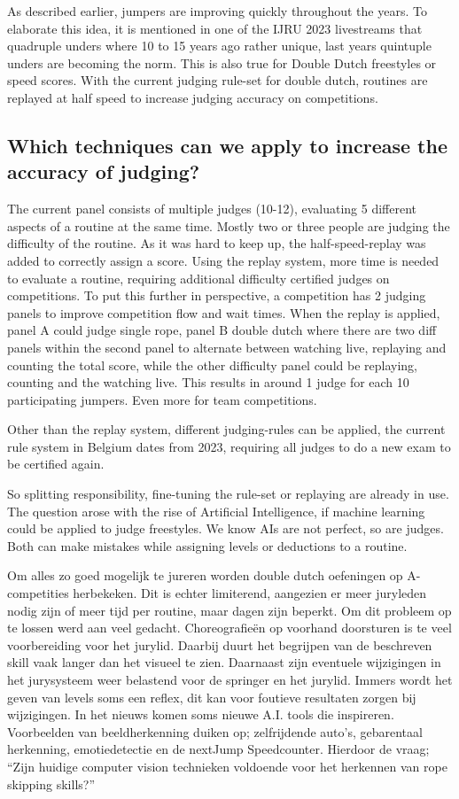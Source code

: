 As described earlier, jumpers are improving quickly throughout the years. To elaborate this idea, it is mentioned in one of the IJRU 2023 livestreams that quadruple unders where 10 to 15 years ago rather unique, last years quintuple unders are becoming the norm. This is also true for Double Dutch freestyles or speed scores. With the current judging rule-set for double dutch, routines are replayed at half speed to increase judging accuracy on competitions.

\subsection{Which techniques can we apply to increase the accuracy of judging?}

The current panel consists of multiple judges (10-12), evaluating 5 different aspects of a routine at the same time. Mostly two or three people are judging the difficulty of the routine. As it was hard to keep up, the half-speed-replay was added to correctly assign a score.
Using the replay system, more time is needed to evaluate a routine, requiring additional difficulty certified judges on competitions. To put this further in perspective, a competition has 2 judging panels to improve competition flow and wait times. When the replay is applied, panel A could judge single rope, panel B double dutch where there are two diff panels within the second panel to alternate between watching live, replaying and counting the total score, while the other difficulty panel could be replaying, counting and the watching live. This results in around 1 judge for each 10 participating jumpers. Even more for team competitions.

Other than the replay system, different judging-rules can be applied, the current rule system in Belgium dates from 2023, requiring all judges to do a new exam to be certified again.

So splitting responsibility, fine-tuning the rule-set or replaying are already in use. The question arose with the rise of Artificial Intelligence, if machine learning could be applied to judge freestyles. We know AIs are not perfect, so are judges. Both can make mistakes while assigning levels or deductions to a routine.


Om alles zo goed mogelijk te jureren worden double dutch oefeningen op A-competities herbekeken. Dit is echter limiterend, aangezien er meer juryleden nodig zijn of meer tijd per routine, maar dagen zijn beperkt.
Om dit probleem op te lossen werd aan veel gedacht. Choreografieën op voorhand doorsturen is te veel voorbereiding voor het jurylid. Daarbij duurt het begrijpen van de beschreven skill vaak langer dan het visueel te zien.
Daarnaast zijn eventuele wijzigingen in het jurysysteem weer belastend voor de springer en het jurylid. Immers wordt het geven van levels soms een reflex, dit kan voor foutieve resultaten zorgen bij wijzigingen.
In het nieuws komen soms nieuwe A.I. tools die inspireren. Voorbeelden van beeldherkenning duiken op; zelfrijdende auto's, gebarentaal herkenning, emotiedetectie en de nextJump Speedcounter. Hierdoor de vraag; ``Zijn huidige computer vision technieken voldoende voor het herkennen van rope skipping skills?''

